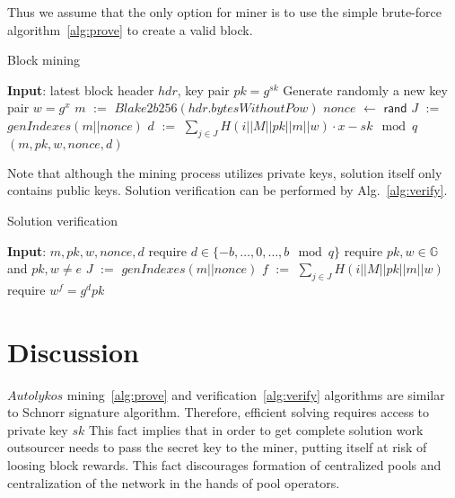 \documentclass[]{article}
\newcommand{\Name}{$Autolykos$}
\def\Let#1#2{\State #1 $:=$ #2}
\def\LetRnd#1#2{\State #1 $\gets$ #2}
\begin{document}
    Thus we assume that the only option for miner is to use the simple brute-force algorithm~\ref{alg:prove} to
    create a valid block.

    \begin{algorithm}[H]
        \caption{Block mining}
        \label{alg:prove}
        \begin{algorithmic}[1]
            \State \textbf{Input}: latest block header $hdr$, key pair $pk=g^{sk}$
            \State Generate randomly a new key pair $w=g^x$
            \Let{$m$}{$Blake2b256(hdr.bytesWithoutPow)$}
            \LetRnd{$nonce$}{$\mathsf{rand}$}
            \Let{$J$}{$genIndexes(m||nonce)$}
            \Let{$d$}{$\sum_{j \in J}{H(i||M||pk||m||w)} \cdot x - sk \mod q$}
            \State \Return $(m,pk,w,nonce,d)$
            \EndIf
            \EndWhile
        \end{algorithmic}
    \end{algorithm}

    Note that although the mining process utilizes private keys, solution itself
    only contains public keys. Solution verification can be performed by Alg.~\ref{alg:verify}.

    \begin{algorithm}[H]
        \caption{Solution verification}
        \label{alg:verify}
        \begin{algorithmic}[1]
            \State \textbf{Input}: $m,pk,w,nonce,d$
            \State require $d\in\{-b,\dots,0,\dots, b\mod q\}$
            \State require $pk,w\in \mathbb{G}$ and $pk,w \ne e$
            \Let{$J$}{$genIndexes(m||nonce)$}
            \Let{$f$}{$\sum_{j \in J} H(i||M||pk||m||w)$}
            \State require $w^f = g^dpk$
        \end{algorithmic}
    \end{algorithm}

    \section{Discussion}
    \label{discussion}

    \Name{} mining~\ref{alg:prove} and verification~\ref{alg:verify} algorithms
    are similar to Schnorr signature algorithm. Therefore, efficient solving
    requires access to private key $sk$ This fact implies that in order to get
    complete solution work outsourcer needs to pass the secret key to the miner,
    putting itself at risk of loosing block rewards.
    This fact discourages formation of centralized pools and centralization of the network in the hands of pool operators.
\end{document}
